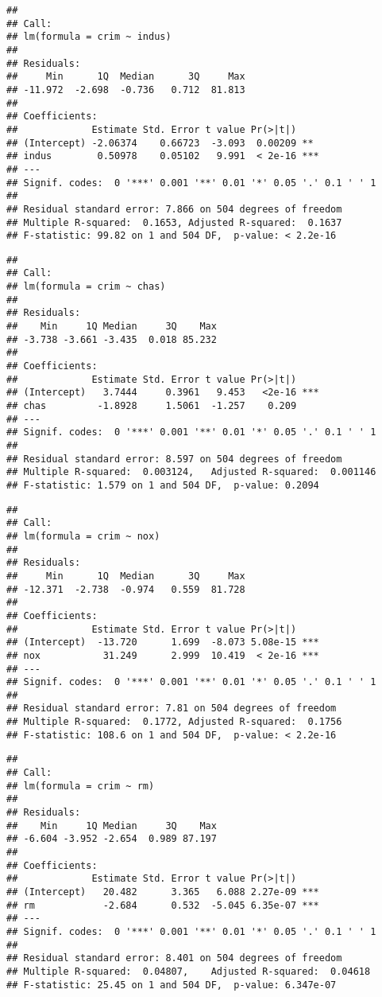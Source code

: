 \documentclass[
]{article}
\begin{document}
\begin{verbatim}
## 
## Call:
## lm(formula = crim ~ indus)
## 
## Residuals:
##     Min      1Q  Median      3Q     Max 
## -11.972  -2.698  -0.736   0.712  81.813 
## 
## Coefficients:
##             Estimate Std. Error t value Pr(>|t|)    
## (Intercept) -2.06374    0.66723  -3.093  0.00209 ** 
## indus        0.50978    0.05102   9.991  < 2e-16 ***
## ---
## Signif. codes:  0 '***' 0.001 '**' 0.01 '*' 0.05 '.' 0.1 ' ' 1
## 
## Residual standard error: 7.866 on 504 degrees of freedom
## Multiple R-squared:  0.1653, Adjusted R-squared:  0.1637 
## F-statistic: 99.82 on 1 and 504 DF,  p-value: < 2.2e-16
\end{verbatim}

\begin{verbatim}
## 
## Call:
## lm(formula = crim ~ chas)
## 
## Residuals:
##    Min     1Q Median     3Q    Max 
## -3.738 -3.661 -3.435  0.018 85.232 
## 
## Coefficients:
##             Estimate Std. Error t value Pr(>|t|)    
## (Intercept)   3.7444     0.3961   9.453   <2e-16 ***
## chas         -1.8928     1.5061  -1.257    0.209    
## ---
## Signif. codes:  0 '***' 0.001 '**' 0.01 '*' 0.05 '.' 0.1 ' ' 1
## 
## Residual standard error: 8.597 on 504 degrees of freedom
## Multiple R-squared:  0.003124,   Adjusted R-squared:  0.001146 
## F-statistic: 1.579 on 1 and 504 DF,  p-value: 0.2094
\end{verbatim}

\begin{verbatim}
## 
## Call:
## lm(formula = crim ~ nox)
## 
## Residuals:
##     Min      1Q  Median      3Q     Max 
## -12.371  -2.738  -0.974   0.559  81.728 
## 
## Coefficients:
##             Estimate Std. Error t value Pr(>|t|)    
## (Intercept)  -13.720      1.699  -8.073 5.08e-15 ***
## nox           31.249      2.999  10.419  < 2e-16 ***
## ---
## Signif. codes:  0 '***' 0.001 '**' 0.01 '*' 0.05 '.' 0.1 ' ' 1
## 
## Residual standard error: 7.81 on 504 degrees of freedom
## Multiple R-squared:  0.1772, Adjusted R-squared:  0.1756 
## F-statistic: 108.6 on 1 and 504 DF,  p-value: < 2.2e-16
\end{verbatim}

\begin{verbatim}
## 
## Call:
## lm(formula = crim ~ rm)
## 
## Residuals:
##    Min     1Q Median     3Q    Max 
## -6.604 -3.952 -2.654  0.989 87.197 
## 
## Coefficients:
##             Estimate Std. Error t value Pr(>|t|)    
## (Intercept)   20.482      3.365   6.088 2.27e-09 ***
## rm            -2.684      0.532  -5.045 6.35e-07 ***
## ---
## Signif. codes:  0 '***' 0.001 '**' 0.01 '*' 0.05 '.' 0.1 ' ' 1
## 
## Residual standard error: 8.401 on 504 degrees of freedom
## Multiple R-squared:  0.04807,    Adjusted R-squared:  0.04618 
## F-statistic: 25.45 on 1 and 504 DF,  p-value: 6.347e-07
\end{verbatim}
\end{document}
